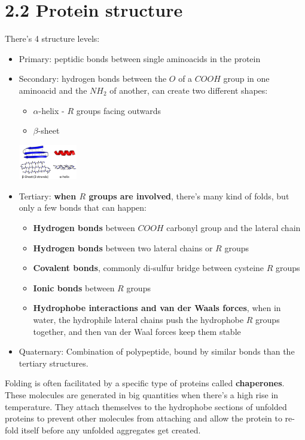 \documentclass[a4paper,landscape,10pt]{cheatsheet}
\begin{document}
\section*{2.2 Protein structure}
There's 4 structure levels:
\begin{itemize}
      \item Primary: peptidic bonds between single aminoacids in the protein
      \item Secondary: hydrogen bonds between the $O$ of a $COOH$ group in one aminoacid and the $NH_2$ of another, can
            create two different shapes:
            \begin{itemize}
                  \item $\alpha$-helix - $R$ groups facing outwards
                  \item $\beta$-sheet
            \end{itemize}
            \includegraphics[width=0.2\textwidth]{images/secondary_protein_structure.png}
      \item Tertiary: \textbf{when $R$ groups are involved}, there's many kind of folds, but only a few bonds that can
            happen:
            \begin{itemize}
                  \item \textbf{Hydrogen bonds} between $COOH$ carbonyl group and the lateral chain
                  \item \textbf{Hydrogen bonds} between two lateral chains or $R$ groups
                  \item \textbf{Covalent bonds}, commonly di-sulfur bridge between cysteine $R$ groups
                  \item \textbf{Ionic bonds} between $R$ groups
                  \item \textbf{Hydrophobe interactions and van der Waals forces}, when in water, the hydrophile lateral chains
                        push the hydrophobe $R$ groups together, and then van der Waal forces keep them stable
            \end{itemize}
      \item Quaternary: Combination of polypeptide, bound by similar bonds than the tertiary structures.
\end{itemize}
Folding is often facilitated by a specific type of proteins called \textbf{chaperones}. These molecules are generated in
big quantities when there's a high rise in temperature. They attach themselves to the hydrophobe sections of unfolded
proteins to prevent other molecules from attaching and allow the protein to re-fold itself before any unfolded
aggregates get created.
\end{document}
